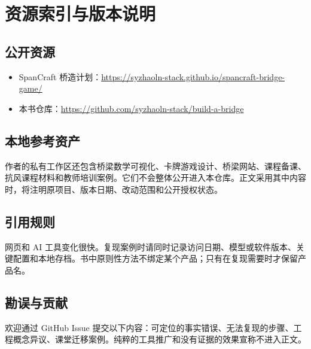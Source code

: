 \chapter{资源索引与版本说明}

\section*{公开资源}

\begin{sloppypar}
\begin{itemize}
  \item SpanCraft 桥造计划：\url{https://syzhaoln-stack.github.io/spancraft-bridge-game/}
  \item 本书仓库：\url{https://github.com/syzhaoln-stack/build-a-bridge}
\end{itemize}
\end{sloppypar}

\section*{本地参考资产}

作者的私有工作区还包含桥梁数学可视化、卡牌游戏设计、桥梁网站、课程备课、抗风课程材料和教师培训案例。它们不会整体公开进入本仓库。正文采用其中内容时，将注明原项目、版本日期、改动范围和公开授权状态。

\section*{引用规则}

网页和 AI 工具变化很快。复现案例时请同时记录访问日期、模型或软件版本、关键配置和本地存档。书中原则性方法不绑定某个产品；只有在复现需要时才保留产品名。

\section*{勘误与贡献}

欢迎通过 GitHub Issue 提交以下内容：可定位的事实错误、无法复现的步骤、工程概念异议、课堂迁移案例。纯粹的工具推广和没有证据的效果宣称不进入正文。
